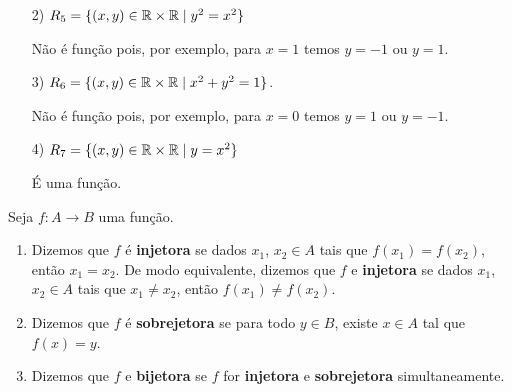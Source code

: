 \documentclass{beamer}
\begin{document}
    \begin{frame}
        \begin{exemplos}
            \begin{enumerate}
                \item[2)] $R_{5} = \{(x,y) \in \mathbb{R}  \times \mathbb{R}  \mid y^2 = x^2\}$
                \begin{solucao}
                    N\~ao \'e fun\c{c}\~ao pois, por exemplo, para $x = 1$ temos $y = -1$ ou $y = 1$.
                \end{solucao}
                \item[3)] $R_{6} = \{(x,y) \in \mathbb{R}  \times \mathbb{R}  \mid x^2 + y^2 = 1\}$.
                \begin{solucao}
                    N\~ao \'e fun\c{c}\~ao pois, por exemplo, para $x = 0$ temos $y = 1$ ou $y = -1$.
                \end{solucao}
                \item[4)] $R_{7} = \{(x,y) \in \mathbb{R}  \times \mathbb{R} \mid y = x^2\}$
                \begin{solucao}
                    \'E uma fun\c{c}\~ao.
                \end{solucao}
            \end{enumerate} 
        \end{exemplos}
    \end{frame}

    \begin{frame}
        \begin{definicao}
            Seja $f : A \to B$ uma fun\c{c}\~ao.
            \begin{enumerate}[label={\roman*})]
                \item Dizemos que $f$ \'e \textbf{injetora} se dados $x_1$, $x_2 \in A$ tais que $f(x_1) = f(x_2)$, ent\~ao $x_1 = x_2$. De modo equivalente, dizemos que $f$ e \textbf{injetora} se dados $x_1$, $x_2 \in A$ tais que $x_1 \ne x_2$, ent\~ao $f(x_1) \ne f(x_2)$.
                \item Dizemos que $f$ \'e \textbf{sobrejetora} se para todo $y \in B$, existe $x \in A$ tal que $f(x) = y$.
                \item Dizemos que $f$ e \textbf{bijetora} se $f$ for \textbf{injetora} e \textbf{sobrejetora} simultaneamente.
            \end{enumerate}
        \end{definicao}
    \end{frame}
\end{document}
